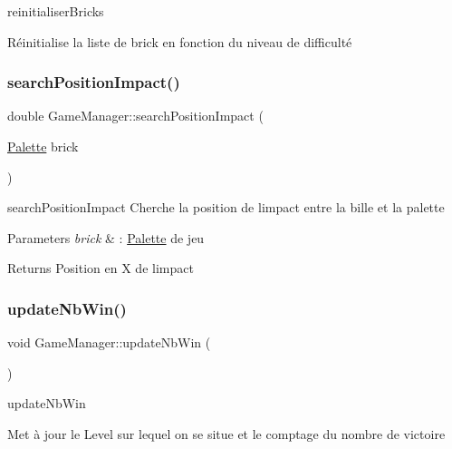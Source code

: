 reinitialiser\+Bricks 

Réinitialise la liste de brick en fonction du niveau de difficulté \mbox{\label{class_game_manager_ab6b2748c5280bc20cbed15f32a18deb9}} 
\subsubsection{\texorpdfstring{search\+Position\+Impact()}{searchPositionImpact()}}
{\footnotesize\ttfamily double Game\+Manager\+::search\+Position\+Impact (\begin{DoxyParamCaption}\item[{\mbox{\hyperlink{class_palette}{Palette}}}]{brick }\end{DoxyParamCaption})}



search\+Position\+Impact Cherche la position de l\textquotesingle{}impact entre la bille et la palette 


\begin{DoxyParams}{Parameters}
{\em brick} & \+: \mbox{\hyperlink{class_palette}{Palette}} de jeu \\
\hline
\end{DoxyParams}
\begin{DoxyReturn}{Returns}
Position en X de l\textquotesingle{}impact 
\end{DoxyReturn}
\mbox{\label{class_game_manager_a10193620d465e7e17285be2533e03f78}} 
\subsubsection{\texorpdfstring{update\+Nb\+Win()}{updateNbWin()}}
{\footnotesize\ttfamily void Game\+Manager\+::update\+Nb\+Win (\begin{DoxyParamCaption}{ }\end{DoxyParamCaption})}



update\+Nb\+Win 

Met à jour le Level sur lequel on se situe et le comptage du nombre de victoire \mbox{\label{class_game_manager_aba55e5cb8867a408fc2492d732446ab8}} 
